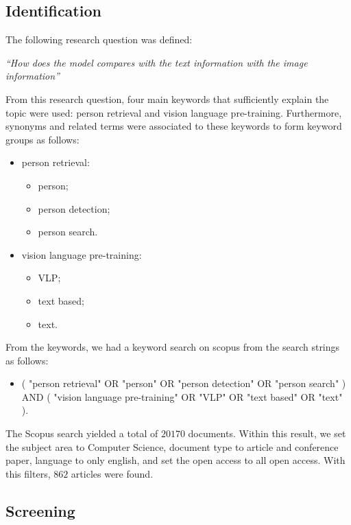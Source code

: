 \subsection*{Identification}

The following research question was defined:

\bigskip
\textit{``How does the model compares with the text information with the image information''}
\bigskip



From this research question, four main keywords that sufficiently explain the topic were used: person retrieval and vision language pre-training.
Furthermore, synonyms and related terms were associated to these keywords to form keyword groups as follows:

\begin{itemize}
    \item person retrieval:
    \begin{itemize}
        \item person;
        \item person detection;
        \item person search.
    \end{itemize}
    \item vision language pre-training:
    \begin{itemize}
        \item VLP;
        \item text based;
        \item text.
    \end{itemize}
\end{itemize}


From the keywords, we had a keyword search on scopus from the search strings as follows:

\begin{itemize}
    \item ( "person retrieval" OR "person" OR "person detection" OR "person search" ) AND ( "vision language pre-training" OR "VLP" OR "text based" OR "text" ).
\end{itemize}

The Scopus search yielded a total of $20170$ documents. Within this result, we set the subject area to Computer Science, document type to article and conference paper, language to only english, and set the open access to all open access. With this filters, $862$ articles were found. 

\subsection*{Screening}

